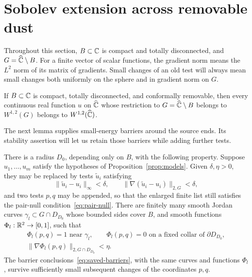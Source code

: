 \section{Sobolev extension across removable dust}\label{sec:sobolev}

Throughout this section, $B\subset\mathbb C$ is compact and totally
disconnected, and $G=\widehat{\mathbb C}\setminus B$.  For a finite vector of scalar
functions, the gradient norm means the $L^2$ norm of its matrix of
gradients.  Small changes of an old test will always mean small changes
both uniformly on the sphere and in gradient norm on $G$.

\begin{theorem}\label{thm:dust-sobolev}
If $B\subset\mathbb C$ is compact, totally disconnected, and conformally
removable, then every continuous real function $u$ on $\widehat{\mathbb C}$ whose
restriction to $G=\widehat{\mathbb C}\setminus B$ belongs to $W^{1,2}(G)$ belongs
to $W^{1,2}(\widehat{\mathbb C})$.
\end{theorem}

The next lemma supplies small-energy barriers around the source ends.
Its stability assertion will let us retain those barriers while adding
further tests.

\begin{lemma}\label{lem:append-tests}
There is a radius $D_0$, depending only on $B$, with the following
property.  Suppose $u_1,\ldots,u_m$ satisfy the hypotheses of
Proposition~\ref{prop:models}.  Given $\delta,\eta>0$, they may be
replaced by tests $\widetilde u_i$ satisfying
\[
 \|\widetilde u_i-u_i\|_\infty<\delta,
 \qquad \|\nabla(\widetilde u_i-u_i)\|_{2,G}<\delta,
\]
and two tests $p,q$ may be appended, so that the enlarged finite list
still satisfies the pair-null condition~\eqref{eq:pair-null}.
There are finitely many smooth Jordan curves $\gamma_l\subset G\cap
D_{D_0}$ whose bounded sides cover $B$, and smooth functions
$\Phi_l:\mathbb R^2\to[0,1]$, such that
\begin{equation}\label{eq:saved-barriers}
 \begin{gathered}
 \Phi_l(p,q)=1\text{ near }\gamma_l,\qquad
 \Phi_l(p,q)=0\text{ on a fixed collar of }\partial D_{D_0},\\
 \|\nabla\Phi_l(p,q)\|_{2,G\cap D_{D_0}}<\eta.
 \end{gathered}
\end{equation}
The barrier conclusions~\eqref{eq:saved-barriers}, with the same curves
and functions $\Phi_l$, survive sufficiently small subsequent changes
of the coordinates $p,q$.
\end{lemma}

